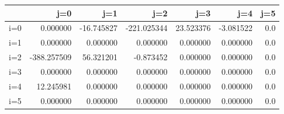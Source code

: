 \begin{tabular}{lrrrrrr}
\toprule
{} &         j=0 &        j=1 &         j=2 &        j=3 &       j=4 &  j=5 \\
\midrule
i=0 &    0.000000 & -16.745827 & -221.025344 &  23.523376 & -3.081522 &  0.0 \\
i=1 &    0.000000 &   0.000000 &    0.000000 &   0.000000 &  0.000000 &  0.0 \\
i=2 & -388.257509 &  56.321201 &   -0.873452 &   0.000000 &  0.000000 &  0.0 \\
i=3 &    0.000000 &   0.000000 &    0.000000 &   0.000000 &  0.000000 &  0.0 \\
i=4 &   12.245981 &   0.000000 &    0.000000 &   0.000000 &  0.000000 &  0.0 \\
i=5 &    0.000000 &   0.000000 &    0.000000 &   0.000000 &  0.000000 &  0.0 \\
\bottomrule
\end{tabular}
